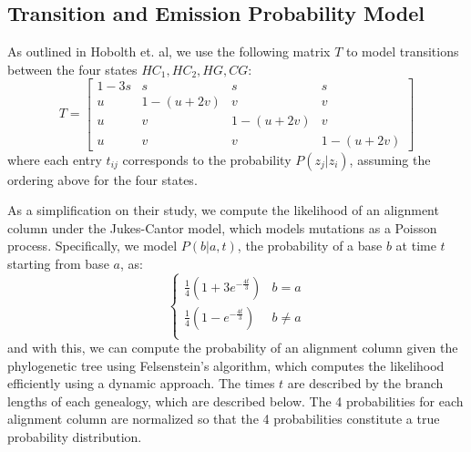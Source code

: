 \documentclass[12pt]{article}
\begin{document}
    \subsection{Transition and Emission Probability Model}
    As outlined in Hobolth et. al, we use the following matrix $T$ to model transitions between the four states $HC_1, HC_2, HG, CG$:
    $$T = \begin{bmatrix} 1 - 3s & s & s & s \\ u & 1 - (u+2v) & v & v \\ u & v & 1 - (u+2v) & v \\ u & v & v & 1 - (u+2v) \end{bmatrix}$$
    where each entry $t_{ij}$ corresponds to the probability $P(z_j | z_i)$, assuming the ordering above for the four states.

    As a simplification on their study, we compute the likelihood of an alignment column under the Jukes-Cantor model, which models mutations as a Poisson process. Specifically, we model $P(b|a, t)$, the probability of a base $b$ at time $t$ starting from base $a$, as:
    \[ \begin{cases} 
            \frac{1}{4}(1 + 3e^{-\frac{4t}{3}}) & b = a \\
            \frac{1}{4}(1 - e^{-\frac{4t}{3}}) & b \ne a \\
        \end{cases}
    \]
    and with this, we can compute the probability of an alignment column given the phylogenetic tree using Felsenstein's algorithm, which computes the likelihood efficiently using a dynamic approach. The times $t$ are described by the branch lengths of each genealogy, which are described below. The 4 probabilities for each alignment column are normalized so that the 4 probabilities constitute a true probability distribution.
\end{document}
